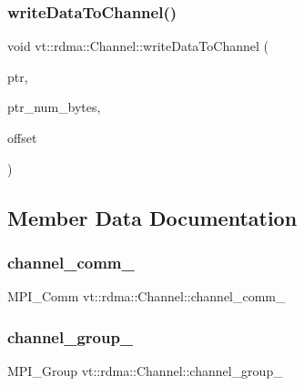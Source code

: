 \subsubsection{\texorpdfstring{write\+Data\+To\+Channel()}{writeDataToChannel()}}
{\footnotesize\ttfamily void vt\+::rdma\+::\+Channel\+::write\+Data\+To\+Channel (\begin{DoxyParamCaption}\item[{\hyperlink{namespacevt_aab05b4a584f7ee835a6d0f66915cf59b}{R\+D\+M\+A\+\_\+\+Ptr\+Type} const \&}]{ptr,  }\item[{\hyperlink{namespacevt_aab8d55968084610ce3b17057981e9300}{Byte\+Type} const \&}]{ptr\+\_\+num\+\_\+bytes,  }\item[{\hyperlink{namespacevt_aab8d55968084610ce3b17057981e9300}{Byte\+Type} const \&}]{offset }\end{DoxyParamCaption})}



\subsection{Member Data Documentation}
\mbox{\label{structvt_1_1rdma_1_1_channel_aded72d4b1d8e8ed23b4e384b96b99c67}} 
\subsubsection{\texorpdfstring{channel\+\_\+comm\+\_\+}{channel\_comm\_}}
{\footnotesize\ttfamily M\+P\+I\+\_\+\+Comm vt\+::rdma\+::\+Channel\+::channel\+\_\+comm\+\_\+\hspace{0.3cm}{\ttfamily [private]}}

\mbox{\label{structvt_1_1rdma_1_1_channel_af4a0e2ef3352ae60e61601d65e120ab9}} 
\subsubsection{\texorpdfstring{channel\+\_\+group\+\_\+}{channel\_group\_}}
{\footnotesize\ttfamily M\+P\+I\+\_\+\+Group vt\+::rdma\+::\+Channel\+::channel\+\_\+group\+\_\+\hspace{0.3cm}{\ttfamily [private]}}

